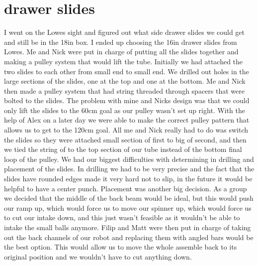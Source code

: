 \section*{drawer slides}
I went on the Lowes sight and figured out what side drawer slides we could get and still be in the 18in box. I ended up choosing the 16in drawer slides from Lowes. Me and Nick were put in charge of putting all the slides together and making a pulley system that would lift the tube. Initially we had attached the two slides to each other from small end to small end. We drilled out holes in the large sections of the slides, one at the top and one at the bottom. Me and Nick then made a pulley system that had string threaded through spacers that were bolted to the slides. The problem with mine and Nicks design was that we could only lift the slides to the 60cm goal as our pulley wasn’t set up right. With the help of Alex on a later day we were able to make the correct pulley pattern that allows us to get to the 120cm goal. All me and Nick really had to do was switch the slides so they were attached small section of first to big of second, and then we tied the string of to the top section of our tube instead of the bottom final loop of the pulley. We had our biggest difficulties with determining in drilling and placement of the slides. In drilling we had to be very precise and the fact that the slides have rounded edges made it very hard not to slip, in the future it would be helpful to have a center punch. Placement was another big decision. As a group we decided that the middle of the back beam would be ideal, but this would push our ramp up, which would force us to move our spinner up, which would force us to cut our intake down, and this just wasn’t feasible as it wouldn’t be able to intake the small balls anymore. Filip and Matt were then put in charge of taking out the back channels of our robot and replacing them with angled bars would be the best option. This would allow us to move the whole assemble back to its original position and we wouldn’t have to cut anything down. 

